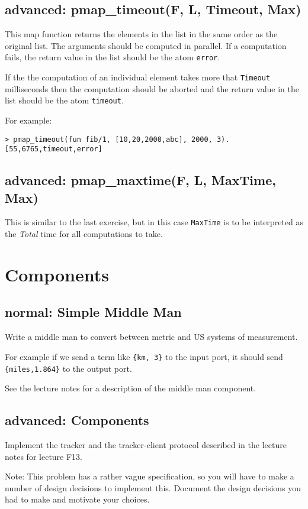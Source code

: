 \documentclass[12pt]{hitec}
\begin{document}
\subsection{advanced: pmap\_timeout(F, L, Timeout, Max)}

This map function returns the elements in the list in the same order
as the original list. The arguments should be computed in parallel. If
a computation fails, the return value in the list should be the atom
\verb+error+.

If the the computation of an individual element takes more that
\verb+Timeout+ milliseconds then the computation should be aborted and
the return value in the list should be the atom \verb+timeout+.

For example:

\begin{Verbatim}
> pmap_timeout(fun fib/1, [10,20,2000,abc], 2000, 3).
[55,6765,timeout,error]
\end{Verbatim}

\subsection{advanced: pmap\_maxtime(F, L, MaxTime, Max)}

This is similar to the last exercise, but in this case \verb+MaxTime+ is to
be interpreted as the {\sl Total} time for all computations to take.

\section{Components}

\subsection{normal: Simple Middle Man}

Write a middle man to convert between metric and US systems of
measurement.

For example if we send a term like \verb+{km, 3}+ to the 
input port, it should send \verb+{miles,1.864}+ to the  output port.

See the lecture notes for a description of the middle man component.

\subsection{advanced: Components}

Implement the tracker and the tracker-client protocol described
in the lecture notes for lecture F13.

Note: This problem has a rather vague specification, so you will have to
make a number of design decisions to implement this. Document the
design decisions you had to make and motivate your choices.
 
\end{document}
